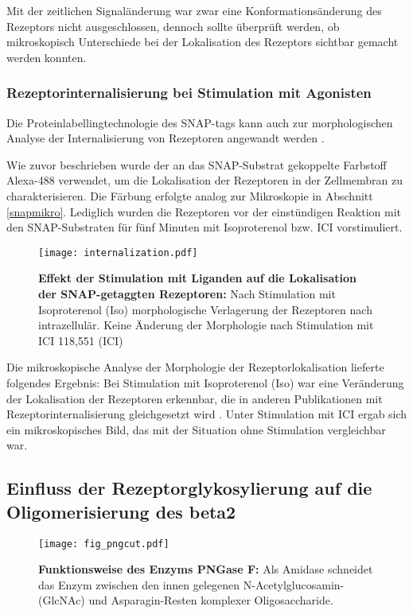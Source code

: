 Mit der zeitlichen Signaländerung war zwar eine Konformationsänderung des Rezeptors nicht ausgeschlossen, dennoch sollte überprüft werden, ob mikroskopisch Unterschiede bei der Lokalisation des Rezeptors sichtbar gemacht werden konnten.

\subsubsection{Rezeptorinternalisierung bei Stimulation mit Agonisten}
Die Proteinlabellingtechnologie des SNAP-tags kann auch zur morphologischen Analyse der Internalisierung von Rezeptoren angewandt werden \parencite{Koo2012}. 

Wie zuvor beschrieben wurde der an das SNAP-Substrat gekoppelte Farbstoff Alexa-488 verwendet, um die Lokalisation der Rezeptoren in der Zellmembran zu charakterisieren. Die Färbung erfolgte analog zur Mikroskopie in Abschnitt \ref{snapmikro}. Lediglich wurden die Rezeptoren vor der einstündigen Reaktion mit den SNAP-Substraten für fünf Minuten mit Isoproterenol bzw. ICI vorstimuliert.

\begin{figure}[htbp]
	\centering
    \texttt{[image: internalization.pdf]}
    \caption{\textbf{Effekt der Stimulation mit Liganden auf die Lokalisation der SNAP-getaggten Rezeptoren:} Nach Stimulation mit Isoproterenol (Iso) morphologische Verlagerung der Rezeptoren nach intrazellulär. Keine Änderung der Morphologie nach Stimulation mit ICI 118,551 (ICI)} 
    \label{fig:internalization}
\end{figure}

Die mikroskopische Analyse der Morphologie der Rezeptorlokalisation lieferte folgendes Ergebnis: Bei Stimulation mit Isoproterenol (Iso) war eine Veränderung der Lokalisation der Rezeptoren erkennbar, die in anderen Publikationen mit Rezeptorinternalisierung gleichgesetzt wird \parencite{Koo2012}. Unter Stimulation mit ICI ergab sich ein mikroskopisches Bild, das mit der Situation ohne Stimulation vergleichbar war.

\subsection{Einfluss der Rezeptorglykosylierung auf die Oligomerisierung des \gls{beta2}}

\begin{figure}[htbp]
	\centering
    \texttt{[image: fig\_pngcut.pdf]}
    \caption{\textbf{Funktionsweise des Enzyms PNGase F:} Als Amidase schneidet das Enzym zwischen den innen gelegenen N-Acetylglucosamin- (GlcNAc) und Asparagin-Resten komplexer Oligosaccharide.} 
    \label{fig:png_cut}
\end{figure}

